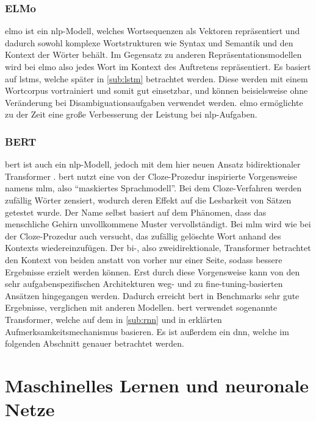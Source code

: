 \subsubsection{ELMo}\label{subsub:elmo}
\ac{elmo}
\citep{elmo} ist ein \ac{nlp}-Modell, welches Wortsequenzen als Vektoren repräsentiert und dadurch sowohl komplexe Wortstrukturen wie Syntax und Semantik und den Kontext der Wörter behält.
Im Gegensatz zu anderen Repräsentationsmodellen wird bei \ac{elmo} also jedes Wort im Kontext des Auftretens repräsentiert.
Es basiert auf \acsp{lstm}, welche später in \cref{sub:lstm} betrachtet werden.
Diese werden mit einem Wortcorpus vortrainiert und somit gut einsetzbar, und können beisielsweise ohne Veränderung bei Disambiguationsaufgaben verwendet werden.
\ac{elmo} ermöglichte zu der Zeit eine große Verbesserung der Leistung bei \ac{nlp}-Aufgaben.

\subsubsection{BERT}\label{subsub:bert}
\ac{bert}
\citep{bert} ist auch ein \ac{nlp}-Modell, jedoch mit dem hier neuen Ansatz bidirektionaler Transformer \citep{attention}.
\ac{bert} nutzt eine von der Cloze-Prozedur inspirierte Vorgensweise namens \ac{mlm}, also \enquote{maskiertes Sprachmodell}.
Bei dem Cloze-Verfahren werden zufällig Wörter zensiert, wodurch deren Effekt auf die Lesbarkeit von Sätzen getestet wurde.
Der Name selbst basiert auf dem Phänomen, dass das menschliche Gehirn unvollkommene Muster vervollständigt.
Bei \ac{mlm} wird wie bei der Cloze-Prozedur auch versucht, das zufällig gelöschte Wort anhand des Kontexts wiedereinzufügen.
Der bi-, also zweidirektionale, Transformer betrachtet den Kontext von beiden anstatt von vorher nur einer Seite, sodass bessere Ergebnisse erzielt werden können.
Erst durch diese Vorgensweise kann von den sehr aufgabenspezifischen Architekturen weg- und zu fine-tuning-basierten Ansätzen hingegangen werden.
Dadurch erreicht \ac{bert} in Benchmarks sehr gute Ergebnisse, verglichen mit anderen Modellen.
\ac{bert} verwendet sogenannte Transformer, welche auf dem in \cref{sub:rnn} und in \citet{annotatedtransformer} erklärten Aufmerksamkeitsmechanismus basieren.
Es ist außerdem ein \acs{dnn}, welche im folgenden Abschnitt genauer betrachtet werden.

\section{Maschinelles Lernen und neuronale Netze}

